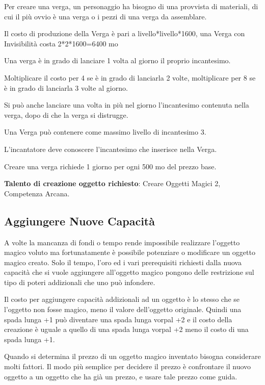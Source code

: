 \begin{multicols}{2}
Per creare una verga, un personaggio ha bisogno di una provvista di materiali, di cui il più ovvio è una verga o i pezzi di una verga da assemblare.

\medskip

Il costo di produzione della Verga è pari a livello*livello*1600, una Verga con Invisibilità costa 2*2*1600=6400 mo

\bigskip

Una verga è in grado di lanciare 1 volta al giorno il proprio incantesimo.

Moltiplicare il costo per 4 se è in grado di lanciarla 2 volte, moltiplicare per 8 se è in grado di lanciarla 3 volte al giorno.

Si può anche lanciare una volta in più nel giorno l'incantesimo contenuta nella verga, dopo di che la verga si distrugge.

Una Verga può contenere come massimo livello di incantesimo 3.

L'incantatore deve conoscere l'incantesimo che inserisce nella Verga.

Creare una verga richiede 1 giorno per ogni 500 mo del prezzo base.

\textbf{Talento di creazione oggetto richiesto}: Creare Oggetti Magici 2, Competenza Arcana.

\subsection{Aggiungere Nuove Capacità}\label{aggiungerecapacitamagiche}

A volte la mancanza di fondi o tempo rende impossibile realizzare l'oggetto magico voluto ma fortunatamente è possibile potenziare o modificare un oggetto magico creato. Solo il tempo, l'oro ed i vari prerequisiti richiesti dalla nuova capacità che si vuole aggiungere all'oggetto magico pongono delle restrizione sul tipo di poteri addizionali che uno può infondere.

Il costo per aggiungere capacità addizionali ad un oggetto è lo stesso che se l'oggetto non fosse magico, meno il valore dell'oggetto originale. Quindi una spada lunga +1 può diventare una spada lunga vorpal +2 e il costo della creazione è uguale a quello di una spada lunga vorpal +2 meno il costo di una spada lunga +1.

Quando si determina il prezzo di un oggetto magico inventato bisogna considerare molti fattori. Il modo più semplice per decidere il prezzo è confrontare il nuovo oggetto a un oggetto che ha già un prezzo, e usare tale prezzo come guida.

\end{multicols}

